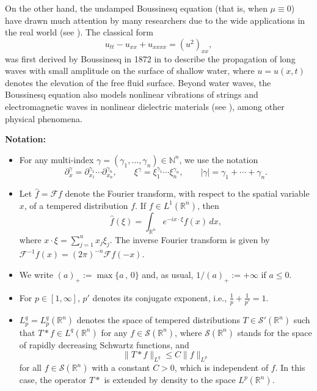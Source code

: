 \documentclass[10pt]{article}
\newcommand{\<}{\langle}
\renewcommand{\>}{\rangle}
\numberwithin{equation}{section}
\newcommand{\R}{{\mathbb{R}}}
\begin{document}
On the other hand, the undamped Boussinesq equation (that is, when $\mu\equiv0$) have drawn much attention by many researchers due to the wide applications in the real world (see \cite{Bona-Sachs=1988, Cho-Ozawa=2007, Farah=2009A, Linares1993, Linares1995, Liu=1997}). The classical form
\[ u_{tt}-u_{xx}+u_{xxxx} = (u^2)_{xx}, \]
was first derived by Boussinesq in 1872 in \cite{Boussinesq1872} to describe the propagation of long waves with small amplitude on the surface of shallow water, where $u=u(x,t)$ denotes the elevation of the free fluid surface. Beyond water waves, the Boussinesq equation also models nonlinear vibrations of strings and electromagnetic waves in nonlinear dielectric materials (see \cite{Turitsyn1993, Zakharov1973}), among other physical phenomena.
\medskip

\noindent\textbf{Notation:}
\begin{itemize}
\item For any multi-index $\gamma=(\gamma_1,\ldots,\gamma_n)\in\mathbb{N}^n$, we use the notation
\[ \partial_x^\gamma = \partial_{x_1}^{\gamma_1}\cdots\partial_{x_n}^{\gamma_n}, \qquad \xi^\gamma=\xi_1^{\gamma_1}\cdots \xi_n^{\gamma_n}, \qquad |\gamma|=\gamma_1+\cdots +\gamma_n. \]
\item Let $\hat f=\mathcal{F}f$ denote the Fourier transform, with respect to the spatial variable $x$, of a tempered distribution $f$. If $f\in L^1(\mathbb{R}^n)$, then
\[ \hat f(\xi) = \int_{\mathbb{R}^n} e^{-ix\cdot\xi}f(x)\,dx, \]
where $x\cdot\xi=\sum_{j=1}^n x_j\xi_j$. The inverse Fourier transform is given by $\mathcal{F}^{-1}f(x) = (2\pi)^{-n}\mathcal{F}f(-x)$.
\item We write $(a)_+:=\max\{a\,,\,0\}$ and, as usual, $1/(a)_+:=+\infty$ if $a\leqslant0$.
\item For $p\in[1,\infty]$, $p'$ denotes its conjugate exponent, i.e., $\frac1p+\frac1{p'}=1$.
\item $L_p^q = L_p^q(\mathbb{R}^n)$ denotes the space of tempered distributions $T\in \mathcal{S}'(\R^n)$ such that $T\ast f\in L^q(\R^n)$ for any $f\in \mathcal{S}(\R^n)$, where $\mathcal{S}(\R^n)$ stands for the space of rapidly decreasing Schwartz functions, and
\[ \|T\ast f\|_{L^q} \leq C\|f\|_{L^p} \]
for all $f\in \mathcal{S}(\R^n)$ with a constant $C>0$, which is independent of $f$. In this case, the operator $T\ast$ is extended by density to the space $L^p(\R^n)$.


\end{itemize}
\end{document}
